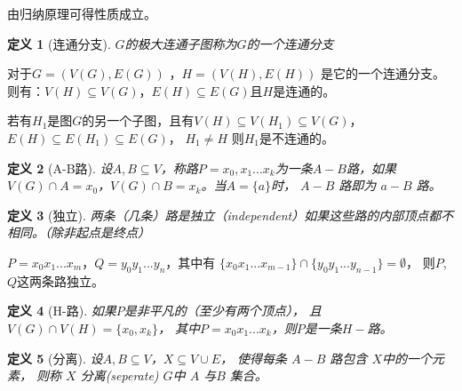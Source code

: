 \documentclass[UTF8]{ctexart}
\newtheorem{mydef}{定义}
\begin{document}
    由归纳原理可得性质成立。
    
    \begin{mydef}[连通分支]
    
    $G$的极大连通子图称为$G$的一个连通分支
    
    \end{mydef}
    
    对于$ G=( V(G),E(G) )$ ，$ H=( V(H),E(H) )$ 是它的一个连通分支。
    则有：$V(H)\subseteq V(G)$，$E(H)\subseteq E(G)$且$H$是连通的。
    
    若有$H_{1}$是图$G$的另一个子图，且有$V(H)\subseteq V(H_{1}) \subseteq V(G)$，$E(H)\subseteq  E(H_{1}) \subseteq E(G)$， $H_{1} \neq H$
    则$H_{1}$是不连通的。
    
    
    
    \begin{mydef}[A-B路]
    
    设$A,B \subseteq V$，称路$P=x_{0},x_{1}...x_{k}$为一条$A-B$路，如果$V(G) \cap A = x_{0}$，$V(G) \cap B = x_{k}$。当$ A= \lbrace a \rbrace $时，
    $A-B$ 路即为 $a-B$ 路。
    
    \end{mydef}
    
    
    \begin{mydef}[独立]
    
    两条（几条）路是独立（independent）如果这些路的内部顶点都不相同。（除非起点是终点）
    \end{mydef}
    
    $P=x_{0}x_{1}...x_{m}$，$Q=y_{0}y_{1}...y_{n}$，其中有 $ \lbrace x_{0}x_{1}...x_{m-1} \rbrace  \cap \lbrace  y_{0}y_{1}...y_{n-1} \rbrace  = \emptyset$，
    则$P$,$Q$这两条路独立。
    
    
    \begin{mydef}[H-路]
    
    如果$P$是非平凡的（至少有两个顶点），
    且$ V(G) \cap V(H) = \lbrace x_{0},x_{k}  \rbrace $，
    其中$ P = x_{0}x_{1}...x_{k}$，则$P$是一条$H-$路。
    
    \end{mydef}
    
    
    \begin{mydef}[分离]
    
    设$ A,B \subseteq V $，$ X \subseteq V \cup E $，
    使得每条 $A-B$ 路包含 $ X $中的一个元素，
    则称 $X $ 分离(seperate) $ G $中 $A$ 与$B$ 集合。
    
    \end{mydef}
    
\end{document}
